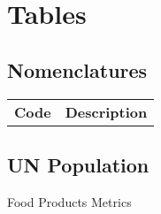 \chapter{Tables}

\pagebreak
\section{Nomenclatures}

\begin{tabular}{l|c}%
    \bfseries Code & \bfseries Description%
\end{tabular}

\pagebreak


\pagebreak
\section{UN Population}\label{app:unpop}


\pagebreak
\begin{table}
    \centering
    \resizebox{1.0\textwidth}{!}{
    
    }
    \caption{Food Products Metrics}
    \label{tab:foodmetrics}
\end{table}
